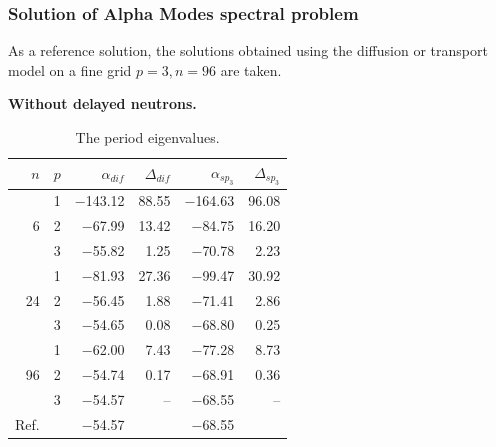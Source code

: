 \documentclass[authoryear]{elsarticle}
\begin{document}
\subsubsection{Solution of Alpha Modes spectral problem}
As a reference solution, the solutions obtained using the diffusion or transport model on a fine grid $ p = 3, n = 96 $ are taken.

\textbf{Without delayed neutrons.}


\begin{table}[h]
\caption{The period eigenvalues.}
\label{tab:iaea_cosym_alpha}
\begin{center}
\begin{tabular}{rrrrrr}
\hline
$n$ & $p$ & $\alpha_{dif}$ & $\Delta_{dif}$ &$\alpha_{sp_3}$& $\Delta_{sp_3}$ \\
\hline
	& 1	&$-$143.12 &  88.55 & $-$164.63& 96.08\\
6	& 2	& $-$67.99 &  13.42 & $-$84.75 & 16.20\\
	& 3	& $-$55.82 &   1.25 & $-$70.78 &  2.23\\ 
\hline
	& 1	& $-$81.93 &  27.36 & $-$99.47 & 30.92\\
24& 2	& $-$56.45 &   1.88 & $-$71.41 & 2.86\\
	& 3	& $-$54.65 &   0.08 & $-$68.80 & 0.25\\ 
\hline
	& 1	& $-$62.00 &   7.43 & $-$77.28 & 8.73\\
96& 2	& $-$54.74 &   0.17 & $-$68.91 & 0.36\\
	& 3	& $-$54.57 &	   -- & $-$68.55 & -- \\ 
\hline
Ref.& & $-$54.57 & & $-$68.55 \\ 
\hline
\end{tabular}
\end{center}
\end{table}
\end{document}
